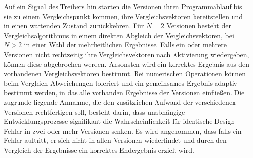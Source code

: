 Auf ein Signal des Treibers hin starten die Versionen ihren Programmablauf bis sie zu einem Vergleichspunkt kommen, ihre Vergleichsvektoren bereitstellen und in einen wartenden Zustand zurückkehren.
Für $N = 2$ Versionen besteht der Vergleichsalgorithmus in einem direkten Abgleich der Vergleichsvektoren, bei $N > 2$ in einer Wahl der mehrheitlichen Ergebnisse. Falls ein oder mehrere Versionen nicht rechtzeitig ihre Vergleichsvektoren nach Aktivierung wiedergeben, können diese abgebrochen werden. Ansonsten wird ein korrektes Ergebnis aus den vorhandenen Vergleichsvektoren bestimmt. Bei numerischen Operationen können beim Vergleich Abweichungen toleriert und ein gemeinsames Ergebnis adaptiv bestimmt werden, in das alle vorhanden Ergebnisse der Versionen einfließen. 
Die zugrunde liegende Annahme, die den zusätzlichen Aufwand der verschiedenen Versionen rechtfertigen soll, besteht darin, dass unabhängige Entwicklungsprozesse signifikant die Wahrscheinlichkeit für identische Design-Fehler in zwei oder mehr Versionen senken.
Es wird angenommen, dass falls ein Fehler auftritt, er sich nicht in allen Versionen wiederfindet und durch den Vergleich der Ergebnisse ein korrektes Endergebnis erzielt wird.



